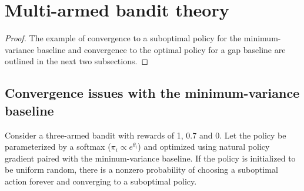 \section{Multi-armed bandit theory}
\label{app:theory_multiarm}
\threearmedbandit*

\begin{proof}
The example of convergence to a suboptimal policy for the minimum-variance baseline and convergence to the optimal policy for a gap baseline are outlined in the next two subsections.
\end{proof}

\subsection{Convergence issues with the minimum-variance baseline}
\label{app:3arm_minvar_baseline_div}

\begin{proposition}
Consider a three-armed bandit with rewards of 1, 0.7 and 0. Let the policy be parameterized by a softmax ($\pi_i \propto e^{\theta_i}$) and optimized using natural policy gradient paired with the mininum-variance baseline. 
If the policy is initialized to be uniform random, there is a nonzero probability of choosing a suboptimal action forever and converging to a suboptimal policy.
\end{proposition}


